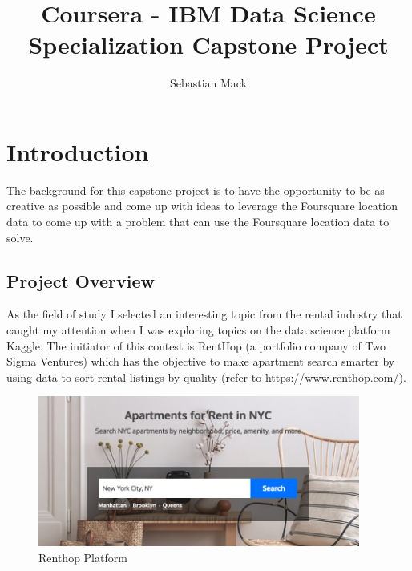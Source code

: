 \documentclass[runningheads]{llncs}
\begin{document}
	\title{Coursera - IBM Data Science Specialization Capstone Project}
    \author{Sebastian Mack}
	\maketitle              %
	
	\begin{abstract}
		
	
	\end{abstract}
	
	\newpage

	\section{Introduction}
	The background for this capstone project is to have the opportunity to be as creative as possible and come up with ideas to leverage the Foursquare location data to come up with a problem that can use the Foursquare location data to solve. 
	
	\subsection{Project Overview}

	As the field of study I selected an interesting topic from the rental industry that caught my attention when I was exploring topics on the data science platform Kaggle. The initiator of this contest is RentHop (a portfolio company of Two Sigma Ventures) which has the objective to make apartment search smarter by using data to sort rental listings by quality (refer to \url{https://www.renthop.com/}).
	
	\begin{figure}[h]
      \centering
      \includegraphics[width=300pt]{rent.png}
      \caption{Renthop Platform}
      \label{fig:rent}
    \end{figure}
    
\end{document}

